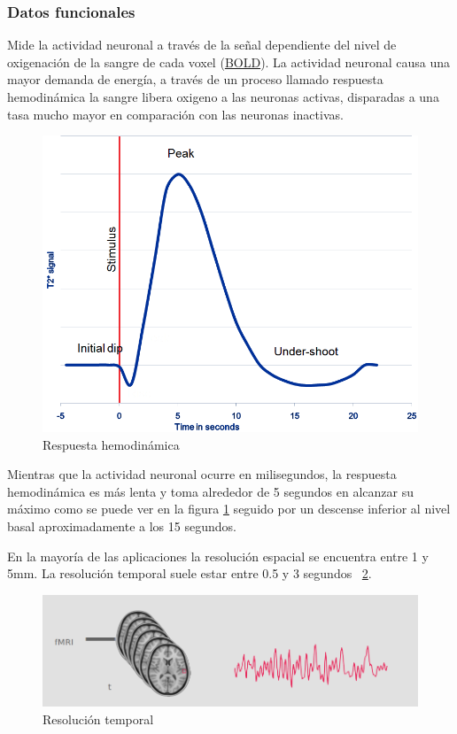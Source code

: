 \subsubsection{Datos funcionales}

Mide la actividad neuronal a través de la señal dependiente del nivel de oxigenación de la sangre de cada voxel (\hyperref[glos:bold]{BOLD}). La actividad neuronal causa una mayor demanda de energía, a través de un proceso llamado respuesta hemodinámica la sangre libera oxigeno a las neuronas activas, disparadas a una tasa mucho mayor en comparación con las neuronas inactivas. \cite{brainhack,bold_fmri}

\begin{figure}[H]
  \centering
    \includegraphics[scale=0.5]{img/bold.png}
  \caption{Respuesta hemodinámica}
  \label{eda:bold}
\end{figure}

Mientras que la actividad neuronal ocurre en milisegundos, la respuesta hemodinámica es más lenta y toma alrededor de 5 segundos en alcanzar su máximo como se puede ver en la figura \ref{eda:bold} seguido por un descense inferior al nivel basal aproximadamente a los 15 segundos.

En la mayoría de las aplicaciones la resolución espacial se encuentra entre 1 y 5mm. La resolución temporal suele estar entre 0.5 y 3 segundos ~\ref{eda:resol}.\cite{courserafmri1,brainhack,fmri_oxford}

\begin{figure}[H]
  \centering
    \includegraphics[scale=0.5]{img/resol.png}
  \caption{Resolución temporal}
  \label{eda:resol}
\end{figure}

